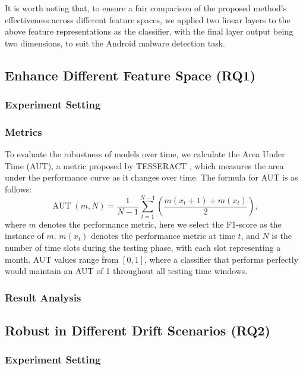 It is worth noting that, to ensure a fair comparison of the proposed method's effectiveness across different feature spaces, we applied two linear layers to the above feature representations as the classifier, with the final layer output being two dimensions, to suit the Android malware detection task.


\subsection{Enhance Different Feature Space (RQ1)}
\subsubsection{Experiment Setting}

\subsubsection{Metrics}
To evaluate the robustness of models over time, we calculate the Area Under Time (AUT), a metric proposed by TESSERACT \cite{tesseract}, which measures the area under the performance curve as it changes over time. The formula for AUT is as follows:
\begin{equation}
\operatorname{AUT}(m, N)=\frac{1}{N-1} \sum_{t=1}^{N-1}\left(\frac{m(x_t+1)+m(x_t)}{2}\right),
\end{equation}
where $m$ denotes the performance metric, here we select the F1-score as the instance of $m$. $m(x_t)$ denotes the performance metric at time $t$, and $N$ is the number of time slots during the testing phase, with each slot representing a month. AUT values range from $[0, 1]$, where a classifier that performs perfectly would maintain an AUT of 1 throughout all testing time windows. 

\subsubsection{Result Analysis}



\subsection{Robust in Different Drift Scenarios (RQ2)}
\subsubsection{Experiment Setting}

